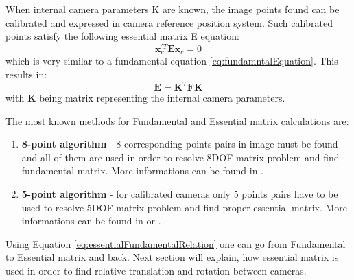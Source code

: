 When internal camera parameters K are known, the image points found can be calibrated and expressed in camera reference position system. Such calibrated points satisfy the following essential matrix E equation:
\begin{equation} \label{eq:essentialEquation}
\textbf{x}_{c}^{'T} \textbf{E} \textbf{x}_{c} = 0
\end{equation} 
which is very similar to a fundamental equation \ref{eq:fundamntalEquation}. This results in:
\begin{equation} \label{eq:essentialFundamentalRelation}
\textbf{E} = \textbf{K}^{T} \textbf{F} \textbf{K}
\end{equation} 
with \textbf{K} being matrix representing the internal camera parameters. 

The most known methods for Fundamental and Essential matrix calculations are:
\begin{enumerate}
\item{\textbf{8-point algorithm}} - 8 corresponding points pairs in image must be found and all of them are used in order to resolve 8DOF matrix problem and find fundamental matrix. More informations can be found in \cite{8Point}.
\item{\textbf{5-point algorithm}} - for calibrated cameras only 5 points pairs have to be used to resolve 5DOF matrix problem and find proper essential matrix. More informations can be found in \cite{iterative5point} or \cite{Batra5point}.
\end{enumerate}
Using Equation \ref{eq:essentialFundamentalRelation} one can go from Fundamental to Essential matrix and back. Next section will explain, how essential matrix is used in order to find relative translation and rotation between cameras.

